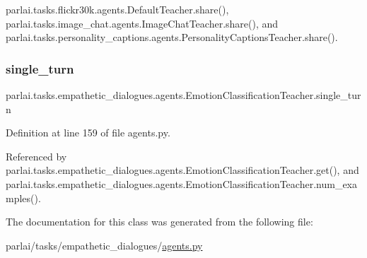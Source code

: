 parlai.\+tasks.\+flickr30k.\+agents.\+Default\+Teacher.\+share(), parlai.\+tasks.\+image\+\_\+chat.\+agents.\+Image\+Chat\+Teacher.\+share(), and parlai.\+tasks.\+personality\+\_\+captions.\+agents.\+Personality\+Captions\+Teacher.\+share().

\mbox{\label{classparlai_1_1tasks_1_1empathetic__dialogues_1_1agents_1_1EmotionClassificationTeacher_a89801cdf1ce6967ca038b50cd9caa94e}} 
\subsubsection{\texorpdfstring{single\+\_\+turn}{single\_turn}}
{\footnotesize\ttfamily parlai.\+tasks.\+empathetic\+\_\+dialogues.\+agents.\+Emotion\+Classification\+Teacher.\+single\+\_\+turn}



Definition at line 159 of file agents.\+py.



Referenced by parlai.\+tasks.\+empathetic\+\_\+dialogues.\+agents.\+Emotion\+Classification\+Teacher.\+get(), and parlai.\+tasks.\+empathetic\+\_\+dialogues.\+agents.\+Emotion\+Classification\+Teacher.\+num\+\_\+examples().



The documentation for this class was generated from the following file\+:\begin{DoxyCompactItemize}
\item 
parlai/tasks/empathetic\+\_\+dialogues/\hyperlink{parlai_2tasks_2empathetic__dialogues_2agents_8py}{agents.\+py}\end{DoxyCompactItemize}
